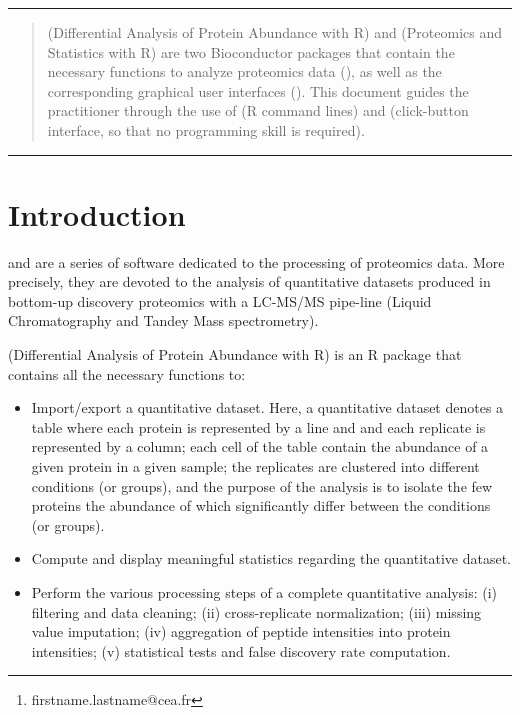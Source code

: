 \documentclass[12pt]{article}
\author{
Samuel Wieczorek\footnote{firstname.lastname@cea.fr} ,
Florence Combes$^\ast$,
Cosmin Lazar,
Quentin Giai Gianetto,\\
Laurent Gatto,
Alexia Dorffer,
Anne-Marie Hesse,
Yohann Coute,\\
Myriam Ferro,
Christophe Bruley
and Thomas Burger$^\ast$
}
\begin{document}


\maketitle



\hrule
\begin{abstract}
 (Differential Analysis of Protein Abundance with R) and  (Proteomics and Statistics with R) are two 
Bioconductor packages that contain the necessary functions to analyze proteomics data (), as well as the corresponding graphical user interfaces (). This document guides the practitioner through the use of  (R command lines) and  (click-button interface, so that no programming skill is required).
\end{abstract}
\hrule
{}

\newpage
\tableofcontents
\newpage

\section{Introduction}\label{sec:intro}



 and  are a series of software dedicated to the processing of proteomics data. More precisely, they are devoted to the analysis of quantitative datasets produced in bottom-up discovery proteomics with a LC-MS/MS pipe-line (Liquid Chromatography and Tandey Mass spectrometry).\newline

 (Differential Analysis of Protein Abundance with R) is an R package that contains all the necessary functions to:
\begin{itemize}
\item {Import/export a quantitative dataset.} Here, a quantitative dataset denotes a table where each protein is represented by a line and and each replicate is represented by a column; each cell of the table contain the abundance of a given protein in a given sample; the replicates are clustered into different conditions (or groups), and the purpose of the analysis is to isolate the few proteins the abundance of which significantly differ between the conditions (or groups).
\item {Compute and display meaningful statistics regarding the quantitative dataset.}
\item {Perform the various processing steps of a complete quantitative analysis}: (i) filtering and data cleaning; (ii) cross-replicate normalization; (iii) missing value imputation; {(iv) aggregation of peptide intensities into protein intensities;} (v) statistical tests and false discovery rate computation.
\end{itemize}
\end{document}
